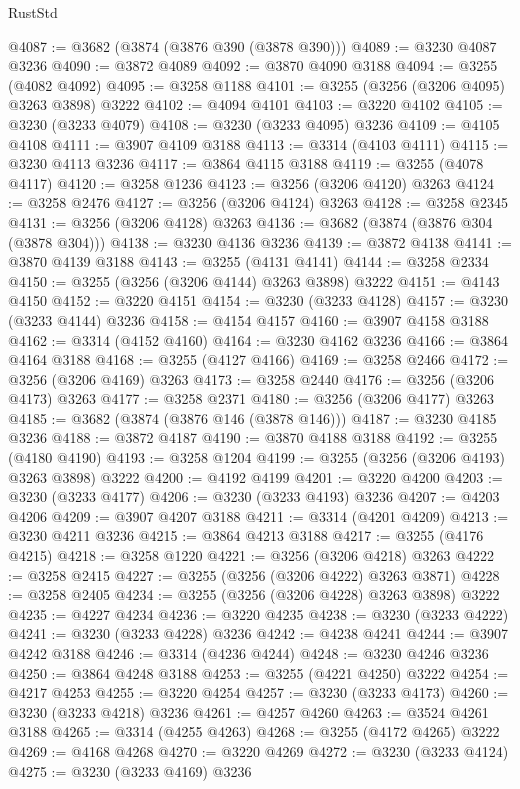 \begin{lexlean}{RustStd}
\begin{coremodule}
{\begin{coremodule}
{{{{{{{{{{{{{{{{{{{{{{{{{{{{{{{{{{{{{@4087 := @3682 (@3874 (@3876 @390 (@3878 @390)))
@4089 := @3230 @4087 @3236
@4090 := @3872 @4089
@4092 := @3870 @4090 @3188
@4094 := @3255 (@4082 @4092)
@4095 := @3258 @1188
@4101 := @3255 (@3256 (@3206 @4095) @3263 @3898) @3222
@4102 := @4094 @4101
@4103 := @3220 @4102
@4105 := @3230 (@3233 @4079)
@4108 := @3230 (@3233 @4095) @3236
@4109 := @4105 @4108
@4111 := @3907 @4109 @3188
@4113 := @3314 (@4103 @4111)
@4115 := @3230 @4113 @3236
@4117 := @3864 @4115 @3188
@4119 := @3255 (@4078 @4117)
@4120 := @3258 @1236
@4123 := @3256 (@3206 @4120) @3263
@4124 := @3258 @2476
@4127 := @3256 (@3206 @4124) @3263
@4128 := @3258 @2345
@4131 := @3256 (@3206 @4128) @3263
@4136 := @3682 (@3874 (@3876 @304 (@3878 @304)))
@4138 := @3230 @4136 @3236
@4139 := @3872 @4138
@4141 := @3870 @4139 @3188
@4143 := @3255 (@4131 @4141)
@4144 := @3258 @2334
@4150 := @3255 (@3256 (@3206 @4144) @3263 @3898) @3222
@4151 := @4143 @4150
@4152 := @3220 @4151
@4154 := @3230 (@3233 @4128)
@4157 := @3230 (@3233 @4144) @3236
@4158 := @4154 @4157
@4160 := @3907 @4158 @3188
@4162 := @3314 (@4152 @4160)
@4164 := @3230 @4162 @3236
@4166 := @3864 @4164 @3188
@4168 := @3255 (@4127 @4166)
@4169 := @3258 @2466
@4172 := @3256 (@3206 @4169) @3263
@4173 := @3258 @2440
@4176 := @3256 (@3206 @4173) @3263
@4177 := @3258 @2371
@4180 := @3256 (@3206 @4177) @3263
@4185 := @3682 (@3874 (@3876 @146 (@3878 @146)))
@4187 := @3230 @4185 @3236
@4188 := @3872 @4187
@4190 := @3870 @4188 @3188
@4192 := @3255 (@4180 @4190)
@4193 := @3258 @1204
@4199 := @3255 (@3256 (@3206 @4193) @3263 @3898) @3222
@4200 := @4192 @4199
@4201 := @3220 @4200
@4203 := @3230 (@3233 @4177)
@4206 := @3230 (@3233 @4193) @3236
@4207 := @4203 @4206
@4209 := @3907 @4207 @3188
@4211 := @3314 (@4201 @4209)
@4213 := @3230 @4211 @3236
@4215 := @3864 @4213 @3188
@4217 := @3255 (@4176 @4215)
@4218 := @3258 @1220
@4221 := @3256 (@3206 @4218) @3263
@4222 := @3258 @2415
@4227 := @3255 (@3256 (@3206 @4222) @3263 @3871)
@4228 := @3258 @2405
@4234 := @3255 (@3256 (@3206 @4228) @3263 @3898) @3222
@4235 := @4227 @4234
@4236 := @3220 @4235
@4238 := @3230 (@3233 @4222)
@4241 := @3230 (@3233 @4228) @3236
@4242 := @4238 @4241
@4244 := @3907 @4242 @3188
@4246 := @3314 (@4236 @4244)
@4248 := @3230 @4246 @3236
@4250 := @3864 @4248 @3188
@4253 := @3255 (@4221 @4250) @3222
@4254 := @4217 @4253
@4255 := @3220 @4254
@4257 := @3230 (@3233 @4173)
@4260 := @3230 (@3233 @4218) @3236
@4261 := @4257 @4260
@4263 := @3524 @4261 @3188
@4265 := @3314 (@4255 @4263)
@4268 := @3255 (@4172 @4265) @3222
@4269 := @4168 @4268
@4270 := @3220 @4269
@4272 := @3230 (@3233 @4124)
@4275 := @3230 (@3233 @4169) @3236
}}}}}}}}}}}}}}}}}}}}}}}}}}}}}}}}}}}}}
\end{coremodule}}
\end{coremodule}
\end{lexlean}
